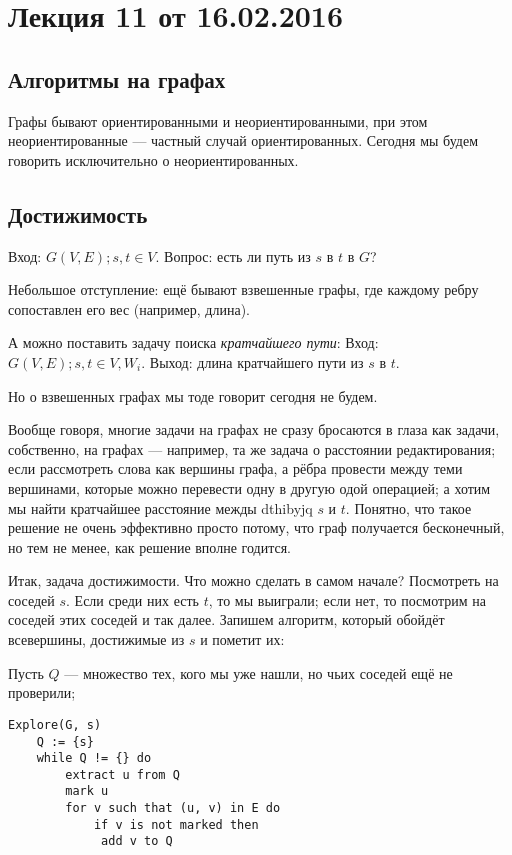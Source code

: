 



\section*{Лекция 11 от 16.02.2016}

\subsection{Алгоритмы на графах}
Графы бывают ориентированными и неориентированными, при этом неориентированные --- частный случай ориентированных. Сегодня мы будем говорить исключительно о неориентированных.

\subsection{Достижимость}
Вход: $G(V, E); s, t \in V$.
Вопрос: есть ли путь из $s$ в $t$ в $G$?

Небольшое отступление: ещё бывают взвешенные графы, где каждому ребру сопоставлен его вес (например, длина).

А можно поставить задачу поиска \emph{кратчайшего пути}:
Вход: $G(V, E); s, t \in V, W_i$.
Выход: длина кратчайшего пути из $s$ в $t$.

Но о взвешенных графах мы тоде говорит сегодня не будем.

Вообще говоря, многие задачи на графах не сразу бросаются в глаза как задачи, собственно, на графах --- например, та же задача о расстоянии редактирования; если рассмотреть слова как вершины графа, а рёбра провести между теми вершинами, которые можно перевести одну в другую одой операцией; а хотим мы найти кратчайшее расстояние межды dthibyjq $s$ и $t$. Понятно, что такое решение не очень эффективно просто потому, что граф получается бесконечный, но тем не менее, как решение вполне годится.

Итак, задача достижимости. Что можно сделать в самом начале? Посмотреть на соседей $s$. Если среди них есть $t$, то мы выиграли; если нет, то посмотрим на соседей этих соседей и так далее. Запишем алгоритм, который обойдёт всевершины, достижимые из $s$ и пометит их: 

Пусть $Q$ --- множество тех, кого мы уже нашли, но чьих соседей ещё не проверили;
\begin{lstlisting}
Explore(G, s)
    Q := {s}
    while Q != {} do
        extract u from Q
        mark u
        for v such that (u, v) in E do
            if v is not marked then
             add v to Q
\end{lstlisting}

